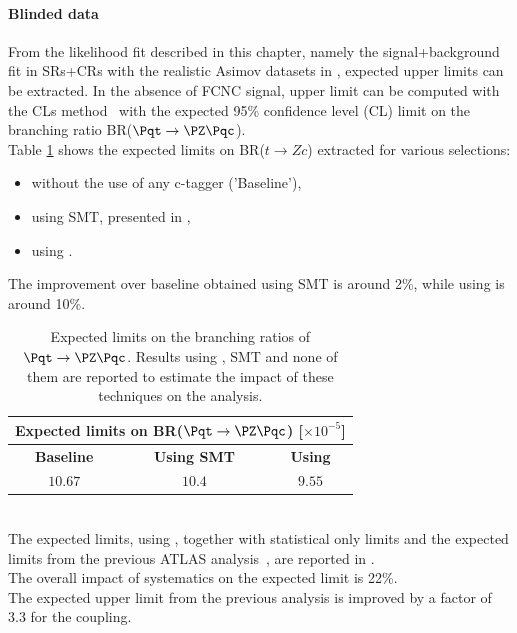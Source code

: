 \paragraph {Blinded data} From the likelihood fit described in this chapter, namely the
signal+background fit in SRs+CRs with the realistic Asimov datasets in ,
expected upper limits can be extracted. In the absence of
FCNC signal, upper limit can be computed with the CLs method~\cite{Junk:1999kv,Read:2002hq} with the expected 95\% confidence level (CL) limit on the branching ratio BR($\Pqt\rightarrow\PZ\Pqc$).\\ 
Table \ref{tab:limits:comparison} shows the expected limits on BR($t \rightarrow Zc$) extracted for various selections: 
\begin{itemize}
	\item without the use of any c-tagger ('Baseline'),
	\item using SMT, presented in ,
	\item using \DLrc.
\end{itemize}
The improvement over baseline obtained using SMT is around 2\%, while using \DLrc is around 10\%.
\begin{table}[htbp]
	\centering
	\begin{tabular}{c|c|c}
		\toprule
		\multicolumn{3}{c}{Expected limits on BR($\Pqt\rightarrow\PZ\Pqc$) [$ \times 10^{-5}$] }\\
		\toprule
		\textbf{Baseline}          & \textbf{Using SMT}			& \textbf{Using \DLrc} \\
		\midrule
		$10.67 $ 	& $ 10.4 $   & $  9.55 $\\
		\bottomrule
	\end{tabular}
	\caption{ Expected limits on the branching ratios of $\Pqt\rightarrow\PZ\Pqc$. 
		Results using \DLrc, SMT and none of them are reported to estimate the impact of these techniques on the analysis.  }%
	\label{tab:limits:comparison}
\end{table}
\\The expected limits, using \DLrc, together
with statistical only limits and the expected limits from the previous ATLAS
analysis~\cite{TOPQ-2017-06}, are reported in
.\\
The overall impact of systematics on the expected limit is 22\%.\\
The expected upper limit from the previous analysis is improved by a factor of 3.3 for the \tZc coupling.
